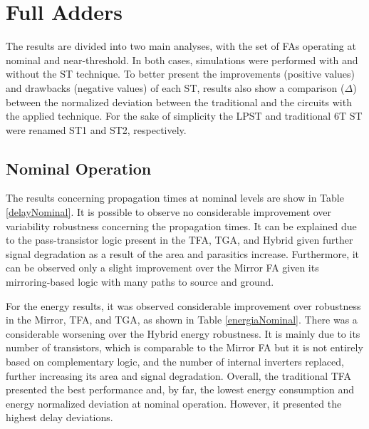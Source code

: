 \documentclass[pgmicro,mestrado,english]{iiufrgs}
\begin{document}
\section{Full Adders}

The results are divided into two main analyses, with the set of FAs operating at nominal and near-threshold. In both cases, simulations were performed with and without the ST technique. To better present the improvements (positive values) and drawbacks (negative values) of each ST, results also show a comparison ($\Delta$) between the normalized deviation between the traditional and the circuits with the applied technique. For the sake of simplicity the LPST and traditional 6T ST were renamed ST1 and ST2, respectively.

\subsection{Nominal Operation}

The results concerning propagation times at nominal levels are show in Table \ref{delayNominal}. It is possible to observe no considerable improvement over variability robustness concerning the propagation times. It can be explained due to the pass-transistor logic present in the TFA, TGA, and Hybrid given further signal degradation as a result of the area and parasitics increase. Furthermore, it can be observed only a slight improvement over the Mirror FA given its mirroring-based logic with many paths to source and ground.

For the energy results, it was observed considerable improvement over robustness in the Mirror, TFA, and TGA, as shown in Table \ref{energiaNominal}. There was a considerable worsening over the Hybrid energy robustness. It is mainly due to its number of transistors, which is comparable to the Mirror FA but it is not entirely based on complementary logic, and the number of internal inverters replaced, further increasing its area and signal degradation. Overall, the traditional TFA presented the best performance and, by far, the lowest energy consumption and energy normalized deviation at nominal operation. However, it presented the highest delay deviations.

\end{document}
